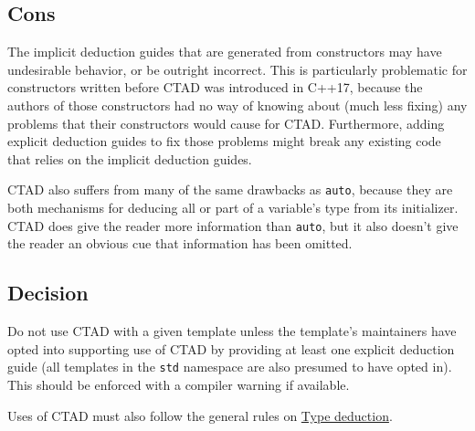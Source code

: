 \subsection{Cons}
The implicit deduction guides that are generated from constructors may have undesirable behavior, or be outright incorrect. This is particularly problematic for constructors written before CTAD was introduced in C++17, because the authors of those constructors had no way of knowing about (much less fixing) any problems that their constructors would cause for CTAD. Furthermore, adding explicit deduction guides to fix those problems might break any existing code that relies on the implicit deduction guides.

CTAD also suffers from many of the same drawbacks as \texttt{auto}, because they are both mechanisms for deducing all or part of a variable's type from its initializer. CTAD does give the reader more information than \texttt{auto}, but it also doesn't give the reader an obvious cue that information has been omitted.

\subsection{Decision}
Do not use CTAD with a given template unless the template's maintainers have opted into supporting use of CTAD by providing at least one explicit deduction guide (all templates in the \texttt{std} namespace are also presumed to have opted in). This should be enforced with a compiler warning if available.

Uses of CTAD must also follow the general rules on \hyperref[sec:type-deduction-(including-auto)]{Type deduction}.
